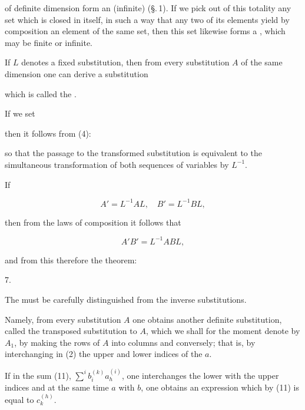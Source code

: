 of definite dimension form an (infinite)  (\S.\,1). If we pick out of this totality any set which is closed in itself, in such a way that any two of its elements yield by composition an element of the same set, then this set likewise forms a , which may be finite or infinite.

If $L$ denotes a fixed substitution, then from every substitution $A$ of the same dimension one can derive a substitution


which is called the .

If we set


then it follows from (4):


so that the passage to the transformed substitution is equivalent to the simultaneous transformation of both sequences of variables by $L^{-1}$.

If

\[
A' = L^{-1}AL, \quad B' = L^{-1}BL,
\]

then from the laws of composition it follows that

\[
A'B' = L^{-1}ABL,
\]

and from this therefore the theorem:

\par
7.\enspace{}

The  must be carefully distinguished from the inverse substitutions.

Namely, from every substitution $A$ one obtains another definite substitution, called the transposed substitution to $A$, which we shall for the moment denote by $A_1$, by making the rows of $A$ into columns and conversely; that is, by interchanging in (2) the upper and lower indices of the $a$.

If in the sum (11), $\sum^i b_i^{(k)} a_h^{(i)}$, one interchanges the lower with the upper indices and at the same time $a$ with $b$, one obtains an expression which by (11) is equal to $c_k^{(h)}$.
